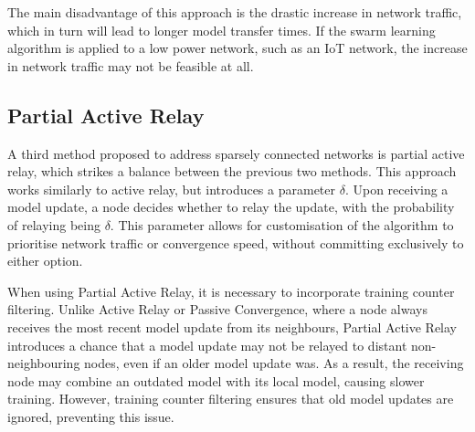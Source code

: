 The main disadvantage of this approach is the drastic increase in network traffic, which in turn will lead to longer model transfer times. If the swarm learning algorithm is applied to a low power network, such as an IoT network, the increase in network traffic may not be feasible at all.

\subsection{Partial Active Relay}
A third method proposed to address sparsely connected networks is partial active relay, which strikes a balance between the previous two methods. This approach works similarly to active relay, but introduces a parameter $\delta$. Upon receiving a model update, a node decides whether to relay the update, with the probability of relaying being $\delta$. This parameter allows for customisation of the algorithm to prioritise network traffic or convergence speed, without committing exclusively to either option.

When using Partial Active Relay, it is necessary to incorporate training counter filtering. Unlike Active Relay or Passive Convergence, where a node always receives the most recent model update from its neighbours, Partial Active Relay introduces a chance that a model update may not be relayed to distant non-neighbouring nodes, even if an older model update was. As a result, the receiving node may combine an outdated model with its local model, causing slower training. However, training counter filtering ensures that old model updates are ignored, preventing this issue.